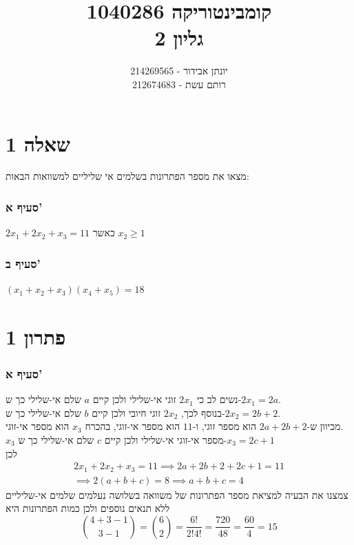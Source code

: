\documentclass[12pt, titlepage]{article}
\title{קומבינטוריקה 1040286 \\ גליון 2}
\author{יונתן אבידור - 214269565\\רותם עשת - 212674683}
\begin{document}
\maketitle
\pagestyle{fancy}
\fancyhead{}
\part*{שאלה 1}
מצאו את מספר הפתרונות בשלמים אי שליליים למשוואות הבאות:
\section*{סעיף א'}
$2x_1+2x_2+x_3=11$ כאשר $x_2 \geq 1$
\section*{סעיף ב'}
$\left(x_1 + x_2 + x_3\right)\left(x_4+x_5\right)=18$
\part*{פתרון 1}
\section*{סעיף א'}
נשים לב כי $2x_1$ זוגי אי-שלילי ולכן קיים $a$ שלם אי-שלילי כך ש-$2x_1=2a$.\\
בנוסף לכך, $2x_2$ זוגי חיובי ולכן קיים $b$ שלם אי-שלילי כך ש-$2x_2 =2b+2$.\\
מכיוון ש-$2a+2b+2$ הוא מספר זוגי, ו-$11$ הוא מספר אי-זוגי, בהכרח $x_3$ הוא מספר אי-זוגי.\\
$x_3$ מספר אי-זוגי אי-שלילי ולכן קיים $c$ שלם אי-שלילי כך ש-$x_3 = 2c+1$\\
לכן
\begin{gather*}
    2x_1 + 2x_2 + x_3 = 11 \implies 2a + 2b + 2 + 2c  + 1 = 11 \\
    \implies 2\left(a+b+c\right) = 8 \implies a+b+c = 4
\end{gather*}
צמצנו את הבעיה למציאת מספר הפתרונות של משוואה בשלושה נעלמים שלמים אי-שליליים ללא תנאים נוספים ולכן כמות הפתרונות היא
\[
    \binom{4+3-1}{3-1} = \binom{6}{2} = \frac{6!}{2!4!} = \frac{720}{48} =\frac{60}{4} = \boxed{15}
\]
\end{document}

